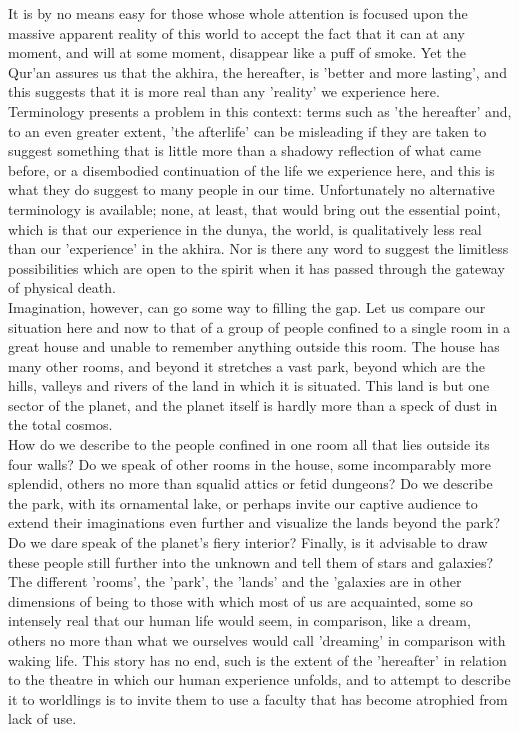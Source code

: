 \documentclass[11pt, b5paper, twoside]{book}
\begin{document}
It is by no means easy for those whose whole attention is focused upon the massive apparent reality 
of this world to accept the fact that it can at any moment, and will at some moment, disappear like a 
puff of smoke. Yet the Qur'an assures us that the akhira, the hereafter, is 'better and more 
lasting', and this suggests that it is more real than any 'reality' we experience here. Terminology 
presents a problem in this context: terms such as 'the hereafter' and, to an even greater extent, 
'the afterlife' can be misleading if they are taken to suggest something that is little more than a 
shadowy reflection of what came before, or a disembodied continuation of the life we experience here, 
and this is what they do suggest to many people in our time. Unfortunately no alternative terminology 
is available; none, at least, that would bring out the essential point, which is that our experience 
in the dunya, the world, is qualitatively less real than our 'experience' in the akhira. Nor is there 
any word to suggest the limitless possibilities which are open to the spirit when it has passed 
through the gateway of physical death. \\

Imagination, however, can go some way to filling the gap. Let us compare our situation here and now 
to that of a group of people confined to a single room in a great house and unable to remember 
anything outside this room. The house has many other rooms, and beyond it stretches a vast park, 
beyond which are the hills, valleys and rivers of the land in which it is situated. This land is but 
one sector of the planet, and the planet itself is hardly more than a speck of dust in the total 
cosmos. \\

How do we describe to the people confined in one room all that lies outside its four walls? Do we 
speak of other rooms in the house, some incomparably more splendid, others no more than squalid 
attics or fetid dungeons? Do we describe the park, with its ornamental lake, or perhaps invite our 
captive audience to extend their imaginations even further and visualize the lands beyond the park? 
Do we dare speak of the planet's fiery interior? Finally, is it advisable to draw these people still 
further into the unknown and tell them of stars and galaxies? \\

The different 'rooms', the 'park', the 'lands' and the 'galaxies are in other dimensions of being to 
those with which most of us are acquainted, some so intensely real that our human life would seem, in 
comparison, like a dream, others no more than what we ourselves would call 'dreaming' in comparison 
with waking life. This story has no end, such is the extent of the 'hereafter' in relation to the 
theatre in which our human experience unfolds, and to attempt to describe it to worldlings is to 
invite them to use a faculty that has become atrophied from lack of use. \\
\end{document}
